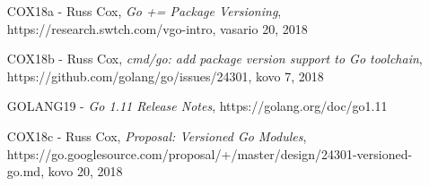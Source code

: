 
\begin{itemize}
    \item [COX18a] - Russ Cox, \emph{Go += Package Versioning}, https://research.swtch.com/vgo-intro, vasario 20, 2018
    \item [COX18b] - Russ Cox, \emph{cmd/go: add package version support to Go toolchain}, https://github.com/golang/go/issues/24301, kovo 7, 2018
    \item [GOLANG19] - \emph{Go 1.11 Release Notes}, https://golang.org/doc/go1.11
    \item [COX18c] - Russ Cox, \emph{Proposal: Versioned Go Modules}, https://go.googlesource.com/proposal/+/master/design/24301-versioned-go.md, kovo 20, 2018
\end{itemize}